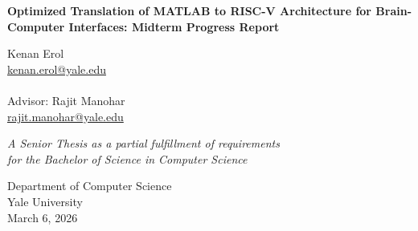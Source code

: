 \begin{titlepage}
    \begin{center}
        \vspace*{1cm}
        
        \huge
        \textbf{Optimized Translation of MATLAB to RISC-V Architecture for Brain-Computer Interfaces: Midterm Progress Report}
        
        \vspace{0.5cm}
        \LARGE
        
        \vspace{1cm}

        \Large
        Kenan Erol\\
        \href{first.last@yale.edu}{kenan.erol@yale.edu}\\~\\
        Advisor: Rajit Manohar\\
        \href{first.last2@yale.edu}{rajit.manohar@yale.edu}
        
        \vfill
        
        \textit{A Senior Thesis as a partial fulfillment
        of requirements \\for the Bachelor of Science in Computer Science}
        
        \vspace{0.8cm}
        
        \Large
        Department of Computer Science\\
        Yale University\\
        March 6, 2026
        
    \end{center}
\end{titlepage}